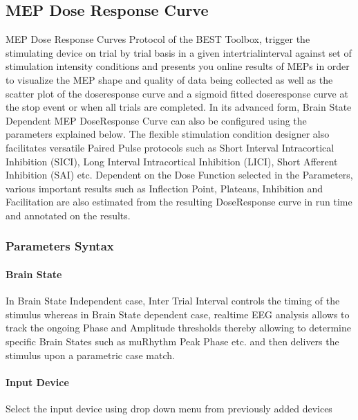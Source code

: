 \documentclass[letterpaper,10pt,english]{sphinxmanual}
\begin{document}
\subsection{MEP Dose Response Curve}
\label{\detokenize{8_MEPDoseResponseCurve:mep-dose-response-curve}}\label{\detokenize{8_MEPDoseResponseCurve::doc}}
\sphinxAtStartPar
MEP Dose Response Curves Protocol of the BEST Toolbox, trigger the stimulating device on trial by trial basis in a given inter\sphinxhyphen{}trial\sphinxhyphen{}interval against set of stimulation intensity conditions and presents you online results of MEPs in order to visualize the MEP shape and quality of data being collected as well as the scatter plot of the dose\sphinxhyphen{}response curve and a sigmoid fitted dose\sphinxhyphen{}response curve at the stop event or when all trials are completed. In its advanced form, Brain State\sphinxhyphen{} Dependent MEP Dose\sphinxhyphen{}Response Curve can also be configured using the parameters explained below.
The flexible stimulation condition designer also facilitates versatile Paired Pulse protocols such as Short Interval Intracortical Inhibition (SICI), Long Interval Intracortical Inhibition (LICI), Short Afferent Inhibition (SAI) etc.
Dependent on the Dose Function selected in the Parameters, various important results such as Inflection Point, Plateaus, Inhibition and Facilitation are also estimated from the resulting Dose\sphinxhyphen{}Response curve in run time and annotated on the results.


\subsubsection{Parameters Syntax}
\label{\detokenize{8_MEPDoseResponseCurve:parameters-syntax}}

\paragraph{Brain State}
\label{\detokenize{8_MEPDoseResponseCurve:brain-state}}
\sphinxAtStartPar
In Brain State Independent case, Inter Trial Interval controls the timing of the stimulus whereas in Brain State dependent case, real\sphinxhyphen{}time EEG analysis allows to track the ongoing Phase and Amplitude thresholds thereby allowing to determine specific Brain States such as mu\sphinxhyphen{}Rhythm Peak Phase etc. and then delivers the stimulus upon a parametric case match.


\paragraph{Input Device}
\label{\detokenize{8_MEPDoseResponseCurve:input-device}}
\sphinxAtStartPar
Select the input device using drop down menu from previously added devices
\end{document}
